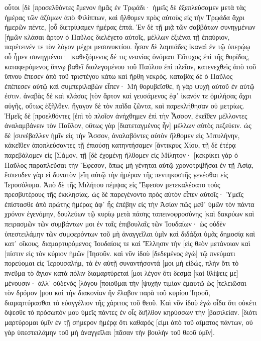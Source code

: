 οὗτοι [δὲ [προσελθόντες ἔμενον ἡμᾶς ἐν Τρῳάδι· 
ἡμεῖς δὲ ἐξεπλεύσαμεν μετὰ τὰς ἡμέρας τῶν ἀζύμων ἀπὸ Φιλίππων, καὶ ἤλθομεν πρὸς αὐτοὺς εἰς τὴν Τρῳάδα ἄχρι ἡμερῶν πέντε, [οὗ διετρίψαμεν ἡμέρας ἑπτά. 
Ἐν δὲ τῇ μιᾷ τῶν σαββάτων συνηγμένων [ἡμῶν κλάσαι ἄρτον ὁ Παῦλος διελέγετο αὐτοῖς, μέλλων ἐξιέναι τῇ ἐπαύριον, παρέτεινέν τε τὸν λόγον μέχρι μεσονυκτίου. 
ἦσαν δὲ λαμπάδες ἱκαναὶ ἐν τῷ ὑπερῴῳ οὗ ἦμεν συνηγμένοι· 
[καθεζόμενος δέ τις νεανίας ὀνόματι Εὔτυχος ἐπὶ τῆς θυρίδος, καταφερόμενος ὕπνῳ βαθεῖ διαλεγομένου τοῦ Παύλου ἐπὶ πλεῖον, κατενεχθεὶς ἀπὸ τοῦ ὕπνου ἔπεσεν ἀπὸ τοῦ τριστέγου κάτω καὶ ἤρθη νεκρός. 
καταβὰς δὲ ὁ Παῦλος ἐπέπεσεν αὐτῷ καὶ συμπεριλαβὼν εἶπεν· Μὴ θορυβεῖσθε, ἡ γὰρ ψυχὴ αὐτοῦ ἐν αὐτῷ ἐστιν. 
ἀναβὰς δὲ καὶ κλάσας [τὸν ἄρτον καὶ γευσάμενος ἐφ᾽ ἱκανόν τε ὁμιλήσας ἄχρι αὐγῆς, οὕτως ἐξῆλθεν. 
ἤγαγον δὲ τὸν παῖδα ζῶντα, καὶ παρεκλήθησαν οὐ μετρίως. 
Ἡμεῖς δὲ [προελθόντες [ἐπὶ τὸ πλοῖον ἀνήχθημεν ἐπὶ τὴν Ἆσσον, ἐκεῖθεν μέλλοντες ἀναλαμβάνειν τὸν Παῦλον, οὕτως γὰρ [διατεταγμένος ἦν] μέλλων αὐτὸς πεζεύειν. 
ὡς δὲ [συνέβαλλεν ἡμῖν εἰς τὴν Ἆσσον, ἀναλαβόντες αὐτὸν ἤλθομεν εἰς Μιτυλήνην, 
κἀκεῖθεν ἀποπλεύσαντες τῇ ἐπιούσῃ κατηντήσαμεν [ἄντικρυς Χίου, τῇ δὲ ἑτέρᾳ παρεβάλομεν εἰς [Σάμον, τῇ [δὲ ἐχομένῃ ἤλθομεν εἰς Μίλητον· 
[κεκρίκει γὰρ ὁ Παῦλος παραπλεῦσαι τὴν Ἔφεσον, ὅπως μὴ γένηται αὐτῷ χρονοτριβῆσαι ἐν τῇ Ἀσίᾳ, ἔσπευδεν γὰρ εἰ δυνατὸν [εἴη αὐτῷ τὴν ἡμέραν τῆς πεντηκοστῆς γενέσθαι εἰς Ἱεροσόλυμα. 
Ἀπὸ δὲ τῆς Μιλήτου πέμψας εἰς Ἔφεσον μετεκαλέσατο τοὺς πρεσβυτέρους τῆς ἐκκλησίας. 
ὡς δὲ παρεγένοντο πρὸς αὐτὸν εἶπεν αὐτοῖς· Ὑμεῖς ἐπίστασθε ἀπὸ πρώτης ἡμέρας ἀφ᾽ ἧς ἐπέβην εἰς τὴν Ἀσίαν πῶς μεθ᾽ ὑμῶν τὸν πάντα χρόνον ἐγενόμην, 
δουλεύων τῷ κυρίῳ μετὰ πάσης ταπεινοφροσύνης [καὶ δακρύων καὶ πειρασμῶν τῶν συμβάντων μοι ἐν ταῖς ἐπιβουλαῖς τῶν Ἰουδαίων· 
ὡς οὐδὲν ὑπεστειλάμην τῶν συμφερόντων τοῦ μὴ ἀναγγεῖλαι ὑμῖν καὶ διδάξαι ὑμᾶς δημοσίᾳ καὶ κατ᾽ οἴκους, 
διαμαρτυρόμενος Ἰουδαίοις τε καὶ Ἕλλησιν τὴν [εἰς θεὸν μετάνοιαν καὶ [πίστιν εἰς τὸν κύριον ἡμῶν [Ἰησοῦν. 
καὶ νῦν ἰδοὺ [δεδεμένος ἐγὼ] τῷ πνεύματι πορεύομαι εἰς Ἰερουσαλήμ, τὰ ἐν αὐτῇ συναντήσοντά [μοι μὴ εἰδώς, 
πλὴν ὅτι τὸ πνεῦμα τὸ ἅγιον κατὰ πόλιν διαμαρτύρεταί [μοι λέγον ὅτι δεσμὰ [καὶ θλίψεις με] μένουσιν· 
ἀλλ᾽ οὐδενὸς [λόγου [ποιοῦμαι τὴν [ψυχὴν τιμίαν ἐμαυτῷ ὡς [τελειῶσαι τὸν δρόμον [μου καὶ τὴν διακονίαν ἣν ἔλαβον παρὰ τοῦ κυρίου Ἰησοῦ, διαμαρτύρασθαι τὸ εὐαγγέλιον τῆς χάριτος τοῦ θεοῦ. 
Καὶ νῦν ἰδοὺ ἐγὼ οἶδα ὅτι οὐκέτι ὄψεσθε τὸ πρόσωπόν μου ὑμεῖς πάντες ἐν οἷς διῆλθον κηρύσσων τὴν [βασιλείαν. 
[διότι μαρτύρομαι ὑμῖν ἐν τῇ σήμερον ἡμέρᾳ ὅτι καθαρός [εἰμι ἀπὸ τοῦ αἵματος πάντων, 
οὐ γὰρ ὑπεστειλάμην τοῦ μὴ ἀναγγεῖλαι [πᾶσαν τὴν βουλὴν τοῦ θεοῦ ὑμῖν]. 
